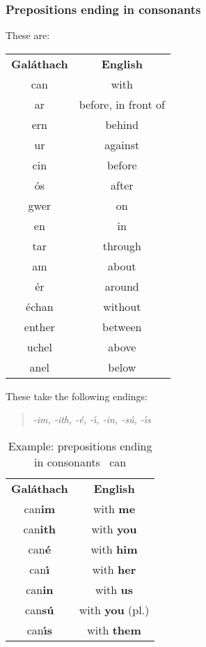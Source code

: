 \subsubsection{Prepositions ending in consonants}
These are:
\begin{table}[H]
\centering
\begin{tabular}{cc}
  \toprule
  \textbf{Gal\'{a}thach} & \textbf{English}\\
  \cmidrule(lr){1-1}\cmidrule(lr){2-2}
  can & with\\
  ar & before, in front of\\
  ern & behind\\
  ur & against\\
  cin & before\\
  \'{o}s & after\\
  gwer & on\\
  en & in\\
  tar & through\\
  am & about\\
  \'{e}r & around\\
  \'{e}chan & without\\
  enther & between\\
  uchel & above\\
  anel & below\\
  \bottomrule
\end{tabular}
\label{summary_prepositions_ending_in_consonants}
\end{table}

These take the following endings:
\begin{quote}
\textit{-im, -ith, -\'{e}, -\'{\i}, -in, -s\'{u}, -\'{\i}s}
\end{quote}

\begin{table}[H]
\centering
\begin{tabular}{cc}
  \toprule
  \textbf{Gal\'{a}thach} & \textbf{English}\\
  \cmidrule(lr){1-1}\cmidrule(lr){2-2}
  can\textbf{im} & with \textbf{me}\\
  can\textbf{ith} & with \textbf{you}\\
  can\textbf{\'{e}} & with \textbf{him}\\
  can\textbf{\'{\i}} & with \textbf{her}\\
  can\textbf{in} & with \textbf{us}\\
  can\textbf{s\'{u}} & with \textbf{you} (pl.)\\
  can\textbf{\'{\i}s} & with \textbf{them}\\
  \bottomrule
\end{tabular}
\caption{Example: prepositions ending in consonants \textendash\ can}
\label{example_prepositions_ending_in_consonants_can}
\end{table}


